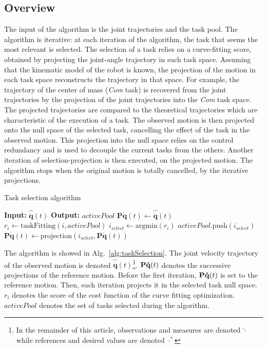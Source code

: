 \documentclass[journal]{IEEEtran}
\begin{document}
\subsection{Overview}
\label{sec:alg1:selec}
The input of the algorithm is the joint trajectories and
the task pool. The algorithm is iterative: at each iteration of the algorithm, the task that seems the
most relevant is selected. The selection of a task relies
on a curve-fitting score, obtained by projecting the joint-angle trajectory in each task space.
Assuming that the kinematic model of the robot is known,
the projection of the motion in each task space reconstructs the trajectory in that space.
For example, the trajectory of the center of mass (\emph{Com} task) is
recovered from the joint trajectories by the projection
of the joint trajectories into the \emph{Com} task space.
The projected trajectories are
compared to the theoretical trajectories which are characteristic
of the execution of a task.
The observed motion is then projected
onto the null space of the selected task, cancelling the effect of the task in the observed motion.
This projection into the null space relies on the control redundancy and
is used to decouple the current tasks from the others.
Another iteration of selection-projection is then executed, on the projected motion.
The algorithm stops when the original motion is totally cancelled, by the iterative projections.
\newcommand{\shOUTPUT}{\textbf{Output: }}
\newcommand{\shINPUT}{\textbf{Input: }}

\begin{algorithm}[t]
  \caption{Task selection algorithm}
  \label{alg:taskSelection}
\begin{algorithmic}[1]
  \STATE \shINPUT $\mathbf{\hat{\dot{q}}}(t)$
\STATE \shOUTPUT $activePool$
\STATE $\mathbf{P}\mathbf{\dot{q}}(t)\gets \mathbf{\hat{\dot{q}}}(t)$
    \STATE $r_i \gets \mathrm{taskFitting}(i, activePool)$
  \ENDFOR
  \STATE $i_{select} \gets \mathrm{argmin}(r_i)$
  \STATE $activePool.\mathrm{push}(i_{select})$
  \STATE $\mathbf{P}\mathbf{\dot{q}}(t) \gets \mathrm{projection}(i_{select}, \mathbf{P}\mathbf{\dot{q}}(t))$
\ENDWHILE
\end{algorithmic}
\end{algorithm}
The algorithm is showed in Alg.~\ref{alg:taskSelection}.
The joint velocity trajectory
of the observed motion is denoted $\mathbf{\hat{\dot{q}}}(t)$\footnote{In the remainder of this article, observations
and measures are denoted $\hat{\cdot}$ while references and desired values are denoted $\cdot^*$}.
${\mathbf{P\dot{q}}}(t)$ denotes the successive projections of the reference
motion. Before the first iteration, ${\mathbf{P\dot{q}}}(t)$ is set to the reference motion.
Then, each iteration projects it in the selected task null space.
$r_i$ denotes the score of the cost function of the curve fitting optimization. $activePool$ denotes
the set of tasks selected during the algorithm.
\end{document}
